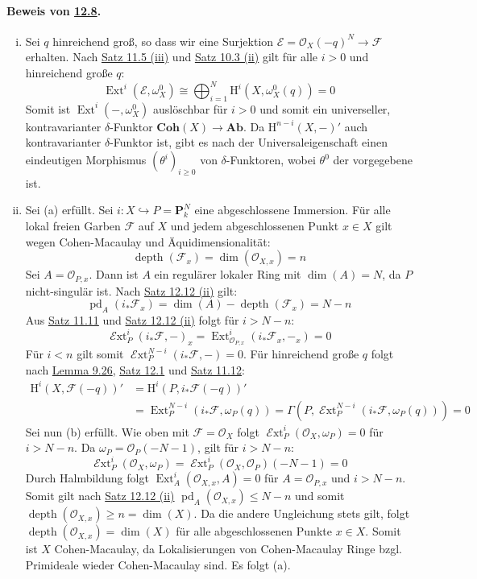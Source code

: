 \paragraph{Beweis von \hyperref[12.8]{12.8}.}\begin{enumerate}[(i)]
\item Sei $q$ hinreichend groß, so dass wir eine Surjektion $\mathcal{E}=\mathcal{O}_X(-q)^N\to\mathcal{F}$ erhalten. Nach \hyperref[11.5]{Satz 11.5 (iii)} und \hyperref[10.3]{Satz 10.3 (ii)} gilt für alle $i>0$ und hinreichend große $q$:
\[\operatorname{Ext}^i(\mathcal{E},\omega_X^0)\cong\bigoplus_{i=1}^N\mathrm{H}^i(X,\omega_X^0(q))=0 \]
Somit ist $\operatorname{Ext}^i(-,\omega_X^0)$ auslöschbar für $i>0$ und somit ein universeller, kontravarianter $\delta$-Funktor $\mathbf{Coh}(X)\to\mathbf{Ab}$. Da $\mathrm{H}^{n-i}(X,-)'$ auch kontravarianter $\delta$-Funktor ist, gibt es nach der Universaleigenschaft einen eindeutigen Morphismus $(\theta^i)_{i\geq 0}$ von $\delta$-Funktoren, wobei $\theta^0$ der vorgegebene ist.
\item Sei (a) erfüllt. Sei $i:X\hookrightarrow P=\mathbf{P}_k^N$ eine abgeschlossene Immersion. Für alle lokal freien Garben $\mathcal{F}$ auf $X$ und jedem abgeschlossenen Punkt $x\in X$ gilt wegen Cohen-Macaulay und Äquidimensionalität:
\[\operatorname{depth}(\mathcal{F}_x)=\dim(\mathcal{O}_{X,x})=n \]
Sei $A=\mathcal{O}_{P,x}$. Dann ist $A$ ein regulärer lokaler Ring mit $\dim(A)=N$, da $P$ nicht-singulär ist. Nach \hyperref[12.12]{Satz 12.12 (ii)} gilt:
\[\operatorname{pd}_A(i_\ast\mathcal{F}_x)=\dim(A) - \operatorname{depth}(\mathcal{F}_x)=N-n \]
Aus \hyperref[11.11]{Satz 11.11} und \hyperref[12.12]{Satz 12.12 (ii)} folgt für $i>N-n$:
\[\operatorname{\mathcal{E}xt}^i_P(i_\ast\mathcal{F},-)_x=\operatorname{Ext}^i_{\mathcal{O}_{P,x}}(i_\ast\mathcal{F}_x, -_x)=0 \]
Für $i<n$ gilt somit $\operatorname{\mathcal{E}xt}^{N-i}_P(i_\ast\mathcal{F},-)=0$. Für hinreichend große $q$ folgt nach \hyperref[9.26]{Lemma 9.26}, \hyperref[12.1]{Satz 12.1} und \hyperref[11.12]{Satz 11.12}:
\begin{align*}
\mathrm{H}^i(X,\mathcal{F}(-q))' &= \mathrm{H}^i(P,i_\ast\mathcal{F}(-q))'\\
&=\operatorname{Ext}_P^{N-i}(i_\ast\mathcal{F},\omega_P(q)) = \Gamma(P,\operatorname{\mathcal{E}xt}_P^{N-i}(i_\ast\mathcal{F},\omega_P(q)))=0
\end{align*}
Sei nun (b) erfüllt. Wie oben mit $\mathcal{F}=\mathcal{O}_X$ folgt $\operatorname{\mathcal{E}xt}^i_P(\mathcal{O}_X,\omega_P)=0$ für $i>N-n$. Da $\omega_P=\mathcal{O}_P(-N-1)$, gilt für $i>N-n$:
\[\operatorname{\mathcal{E}xt}^i_P(\mathcal{O}_X,\omega_P)=\operatorname{\mathcal{E}xt}^i_P(\mathcal{O}_X,\mathcal{O}_P)(-N-1)=0\]
Durch Halmbildung folgt $\operatorname{Ext}_A^i(\mathcal{O}_{X,x},A)=0$ für $A=\mathcal{O}_{P,x}$ und $i>N-n$. Somit gilt nach \hyperref[12.12]{Satz 12.12 (ii)} $\operatorname{pd}_A(\mathcal{O}_{X,x})\leq N-n$ und somit $\operatorname{depth}(\mathcal{O}_{X,x})\geq n=\dim(X)$. Da die andere Ungleichung stets gilt, folgt $\operatorname{depth}(\mathcal{O}_{X,x})=\dim(X)$ für alle abgeschlossenen Punkte $x\in X$. Somit ist $X$ Cohen-Macaulay, da Lokalisierungen von Cohen-Macaulay  Ringe bzgl. Primideale wieder Cohen-Macaulay sind. Es folgt (a).


\end{enumerate}
